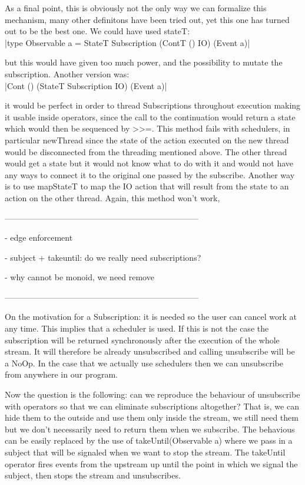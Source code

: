 As a final point, this is obviously not the only way we can formalize this mechanism, many other definitons have been tried out, yet this one has turned out to be the best one. We could have used stateT:\\

\hmint |type Observable a = StateT Subscription (ContT () IO) (Event a)|

but this would have given too much power, and the possibility to mutate the subscription. Another version was:\\

\hmint |Cont () (StateT Subscription IO) (Event a)|

it would be perfect in order to thread Subscriptions throughout execution making it usable inside operators, since the call to the continuation would return a state which would then be sequenced by >>=. This method fails with schedulers, in particular newThread since the state of the action executed on the new thread would be disconnected from the threading mentioned above. The other thread would get a state but it would not know what to do with it and would not have any ways to connect it to the original one passed by the subscribe. Another way is to use mapStateT to map the IO action that will result from the state to an action on the other thread. Again, this method won't work, 





-----------------------------------------------------------------------

- edge enforcement

- subject + takeuntil: do we really need subscriptions?

- why cannot be monoid, we need remove

-----------------------------------------------------------------------

On the motivation for a Subscription: it is needed so the user can cancel work at any time. This implies that a scheduler is used. If this is not the case the subscription will be returned synchronously after the execution of the whole stream. It will therefore be already unsubscribed and calling unsubscribe will be a NoOp. In the case that we actually use schedulers then we can unsubscribe from anywhere in our program. 

Now the question is the following: can we reproduce the behaviour of unsubscribe with operators so that we can eliminate subscriptions altogether? That is, we can hide them to the outside and use them only inside the stream, we still need them but we don't necessarily need to return them when we subscribe. The behavious can be easily replaced by the use of takeUntil(Observable a) where we pass in a subject that will be signaled when we want to stop the stream. The takeUntil operator fires events from the upstream up until the point in which we signal the subject, then stops the stream and unsubscribes. 

